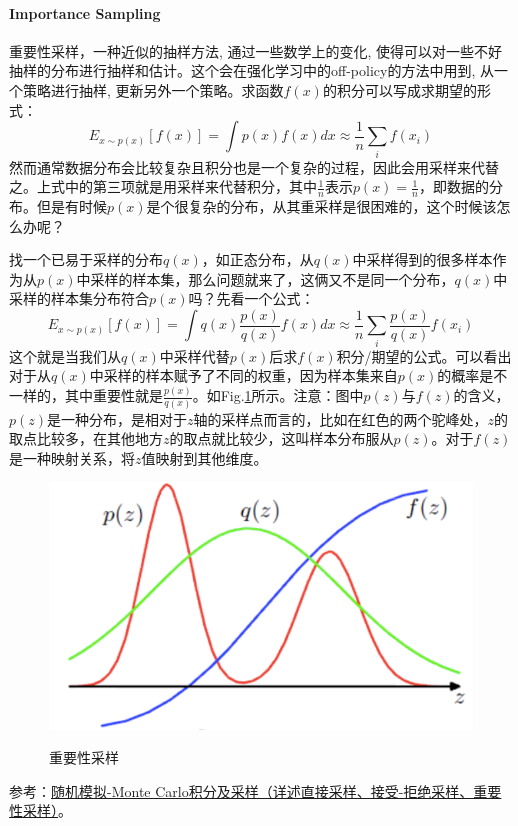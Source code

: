 \paragraph{Importance Sampling}
重要性采样，一种近似的抽样方法, 通过一些数学上的变化, 使得可以对一些不好抽样的分布进行抽样和估计。这个会在强化学习中的off-policy的方法中用到, 从一个策略进行抽样, 更新另外一个策略。求函数$f(x)$的积分可以写成求期望的形式：
$$
E_{x \sim p(x)}[f(x)] = \int p(x) f(x) d x \approx \frac{1}{n} \sum_{i} f(x_{i})
$$
然而通常数据分布会比较复杂且积分也是一个复杂的过程，因此会用采样来代替之。上式中的第三项就是用采样来代替积分，其中$\frac{1}{n}$表示$p(x) = \frac{1}{n}$，即数据的分布。但是有时候$p(x)$是个很复杂的分布，从其重采样是很困难的，这个时候该怎么办呢？

找一个已易于采样的分布$q(x)$，如正态分布，从$q(x)$中采样得到的很多样本作为从$p(x)$中采样的样本集，那么问题就来了，这俩又不是同一个分布，$q(x)$中采样的样本集分布符合$p(x)$吗？先看一个公式：
$$
E_{x \sim p(x)}[f(x)] = \int q(x) \frac{p(x)}{q(x)} f(x) d x \approx \frac{1}{n} \sum_{i}  \frac{p(x)}{q(x)} f(x_{i})
$$
这个就是当我们从$q(x)$中采样代替$p(x)$后求$f(x)$积分/期望的公式。可以看出对于从$q(x)$中采样的样本赋予了不同的权重，因为样本集来自$p(x)$的概率是不一样的，其中重要性就是$\frac{p(x)}{q(x)}$。如Fig.\ref{fig:importance-sample}所示。注意：图中$p(z)$与$f(z)$的含义，$p(z)$是一种分布，是相对于$z$轴的采样点而言的，比如在红色的两个驼峰处，$z$的取点比较多，在其他地方$z$的取点就比较少，这叫样本分布服从$p(z)$。对于$f(z)$是一种映射关系，将$z$值映射到其他维度。

\begin{figure}[h]
	\centering
	\includegraphics[width=.5\textwidth]{pics/importance-sample.png}
	\label{fig:importance-sample}
	\caption{重要性采样}
\end{figure}

参考：\href{https://www.jianshu.com/p/3d30070932a8}{随机模拟-Monte Carlo积分及采样（详述直接采样、接受-拒绝采样、重要性采样）}。


